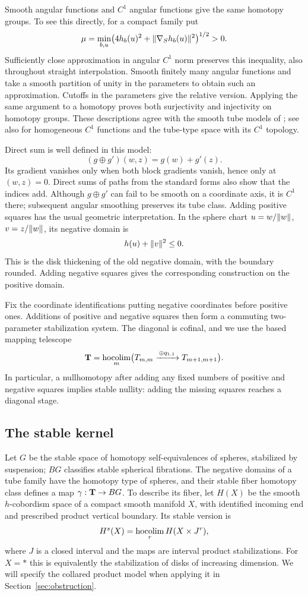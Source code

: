 Smooth angular functions and $C^1$ angular functions give the same
homotopy groups. To see this directly, for a compact family put
\[
 \mu=\min_{b,u}\bigl(4h_b(u)^2+\lVert\nabla_Sh_b(u)\rVert^2\bigr)^{1/2}>0.
\]
Sufficiently close approximation in angular $C^1$ norm preserves this
inequality, also throughout straight interpolation. Smooth finitely many
angular functions and take a smooth partition of unity in the parameters
to obtain such an approximation. Cutoffs in the parameters give the
relative version. Applying the same argument to a homotopy proves both
surjectivity and injectivity on homotopy groups. These descriptions agree
with the smooth tube models of \cite[\S3.6]{AIS2026}; see also
\cite[Definitions~3.10 and~3.36]{AACK2025} for homogeneous $C^1$
functions and the tube-type space with its $C^1$ topology.

Direct sum is well defined in this model:
\[
 (g\oplus g')(w,z)=g(w)+g'(z).
\]
Its gradient vanishes only when both block gradients vanish, hence only at
$(w,z)=0$. Direct sums of paths from the standard forms also show that the
indices add. Although $g\oplus g'$ can fail to be smooth on a coordinate
axis, it is $C^1$ there; subsequent angular smoothing preserves its tube
class. Adding positive squares has the usual geometric interpretation.
In the sphere chart $u=w/\lVert w\rVert$, $v=z/\lVert w\rVert$, its negative domain is
\[
 h(u)+\lVert v\rVert^2\leq0.
\]
This is the disk thickening of the old negative domain, with the boundary
rounded. Adding negative squares gives the corresponding construction on
the positive domain.

Fix the coordinate identifications putting negative coordinates before
positive ones. Additions of positive and negative squares then form a
commuting two-parameter stabilization system. The diagonal is cofinal, and
we use the based mapping telescope
\begin{equation}\label{eq:stable-tubes}
 \mathbf T=\operatorname*{hocolim}_{m}
 \bigl(T_{m,m}\xrightarrow{\,\oplus q_{1,1}\,}T_{m+1,m+1}\bigr).
\end{equation}
In particular, a nullhomotopy after adding any fixed numbers of positive
and negative squares implies stable nullity: adding the missing squares
reaches a diagonal stage.

\subsection{The stable kernel}

Let $G$ be the stable space of homotopy self-equivalences of spheres,
stabilized by suspension; $BG$ classifies stable spherical fibrations.
The negative domains of a tube family have the homotopy type of spheres,
and their stable fiber homotopy class defines a map $\gamma:\mathbf T\to BG$.
To describe its fiber, let $H(X)$ be the smooth $h$-cobordism space
of a compact smooth manifold $X$, with identified incoming end and
prescribed product vertical boundary. Its stable version is
\[
 H^s(X)=\operatorname*{hocolim}_{r}H(X\times J^r),
\]
where $J$ is a closed interval and the maps are interval product
stabilizations. For $X=*$ this is equivalently the stabilization of
disks of increasing dimension. We will specify the collared product
model when applying it in Section~\ref{sec:obstruction}.

